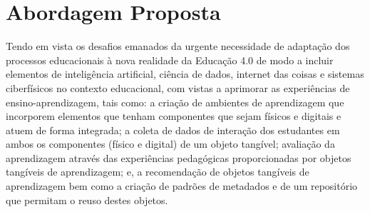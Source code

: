 \section{Abordagem Proposta}

Tendo em vista os desafios emanados da urgente necessidade de adaptação dos processos educacionais à nova realidade da Educação 4.0 de modo a incluir elementos de inteligência artificial, ciência de dados, internet das coisas e sistemas ciberfísicos no contexto educacional, com vistas a aprimorar as experiências de ensino-aprendizagem, tais como: a criação de ambientes de aprendizagem que incorporem elementos que tenham componentes que sejam físicos e digitais  e atuem de forma integrada; a coleta de dados de interação dos estudantes em ambos os componentes (físico e digital) de um objeto tangível; avaliação da aprendizagem através das experiências pedagógicas proporcionadas por objetos tangíveis de aprendizagem; e, a recomendação de objetos tangíveis de aprendizagem bem como a criação de padrões de metadados e de um repositório que permitam o reuso destes objetos.



